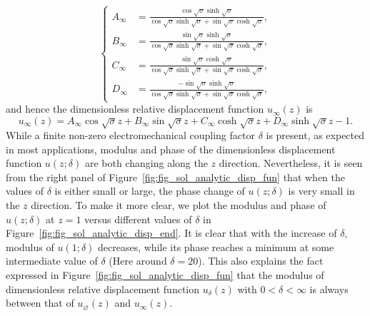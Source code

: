 \documentclass{article}
\begin{document}
\begin{equation}
    \left\{\begin{aligned}
        A_\infty &= \frac{ \cos\sqrt{\sigma } \sinh\sqrt{\sigma } }{ \cos\sqrt{\sigma } \sinh\sqrt{\sigma } + \sin\sqrt{\sigma } \cosh\sqrt{\sigma } }, \\
        B_\infty &= \frac{ \sin\sqrt{\sigma } \sinh\sqrt{\sigma } }{ \cos\sqrt{\sigma } \sinh\sqrt{\sigma } + \sin\sqrt{\sigma } \cosh\sqrt{\sigma } }, \\
        C_\infty &= \frac{ \sin\sqrt{\sigma } \cosh\sqrt{\sigma } }{ \cos\sqrt{\sigma } \sinh\sqrt{\sigma } + \sin\sqrt{\sigma } \cosh\sqrt{\sigma } }, \\
        D_\infty &= \frac{ - \sin\sqrt{\sigma } \sinh\sqrt{\sigma } }{ \cos\sqrt{\sigma } \sinh\sqrt{\sigma } + \sin\sqrt{\sigma } \cosh\sqrt{\sigma } },
    \end{aligned}\right.
    \label{eq:eq_disp_func_coeffs_exps_infty}
\end{equation}
and hence the dimensionless relative displacement function $u_{\infty} (z)$ is
\begin{equation}
    u_{\infty} (z) = A_{\infty} \cos{\sqrt{\sigma}z} + B_{\infty} \sin{\sqrt{\sigma}z} + C_{\infty} \cosh{\sqrt{\sigma}z} + D_{\infty} \sinh{\sqrt{\sigma}z} - 1.
\end{equation}
While a finite non-zero electromechanical coupling factor $\delta$ is present, as expected in most applications, modulus and phase of the dimensionless displacement function $u(z;\delta)$ are both changing along the $z$ direction. Nevertheless, it is seen from the right panel of Figure~\ref{fig:fig_sol_analytic_disp_fun} that when the values of $\delta$ is either small or large, the phase change of $u(z;\delta)$ is very small in the $z$ direction. To make it more clear, we plot the modulus and phase of $u(z;\delta)$ at $z=1$ versus different values of $\delta$ in Figure~\ref{fig:fig_sol_analytic_disp_end}. It is clear that with the increase of $\delta$, modulus of $u(1;\delta)$ decreases, while its phase reaches a minimum at some intermediate value of $\delta$ (Here around $\delta = 20$). This also explains the fact expressed in Figure~\ref{fig:fig_sol_analytic_disp_fun} that the modulus of dimensionless relative displacement function $u_\delta (z)$ with $0 < \delta < \infty$ is always between that of $u_\varnothing (z)$ and $u_\infty (z)$.
\end{document}
